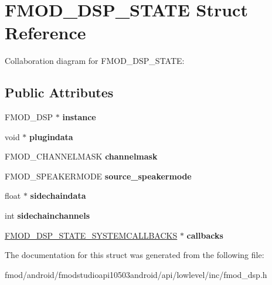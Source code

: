 \hypertarget{struct_f_m_o_d___d_s_p___s_t_a_t_e}{\section{F\+M\+O\+D\+\_\+\+D\+S\+P\+\_\+\+S\+T\+A\+T\+E Struct Reference}
\label{struct_f_m_o_d___d_s_p___s_t_a_t_e}
}


Collaboration diagram for F\+M\+O\+D\+\_\+\+D\+S\+P\+\_\+\+S\+T\+A\+T\+E\+:
\subsection*{Public Attributes}
\begin{DoxyCompactItemize}
\item 
\hypertarget{struct_f_m_o_d___d_s_p___s_t_a_t_e_a237b17d52742d83ced1b38f0c9d487cc}{F\+M\+O\+D\+\_\+\+D\+S\+P $\ast$ {\bfseries instance}}\label{struct_f_m_o_d___d_s_p___s_t_a_t_e_a237b17d52742d83ced1b38f0c9d487cc}

\item 
\hypertarget{struct_f_m_o_d___d_s_p___s_t_a_t_e_a343133eb99b15317082d94436196dbb4}{void $\ast$ {\bfseries plugindata}}\label{struct_f_m_o_d___d_s_p___s_t_a_t_e_a343133eb99b15317082d94436196dbb4}

\item 
\hypertarget{struct_f_m_o_d___d_s_p___s_t_a_t_e_a19d66dedcbccec2671ad65b6e546aa93}{F\+M\+O\+D\+\_\+\+C\+H\+A\+N\+N\+E\+L\+M\+A\+S\+K {\bfseries channelmask}}\label{struct_f_m_o_d___d_s_p___s_t_a_t_e_a19d66dedcbccec2671ad65b6e546aa93}

\item 
\hypertarget{struct_f_m_o_d___d_s_p___s_t_a_t_e_ad37c35be3104130b30239a5770ae7785}{F\+M\+O\+D\+\_\+\+S\+P\+E\+A\+K\+E\+R\+M\+O\+D\+E {\bfseries source\+\_\+speakermode}}\label{struct_f_m_o_d___d_s_p___s_t_a_t_e_ad37c35be3104130b30239a5770ae7785}

\item 
\hypertarget{struct_f_m_o_d___d_s_p___s_t_a_t_e_aeb85891138109aedceed04c92a3493e9}{float $\ast$ {\bfseries sidechaindata}}\label{struct_f_m_o_d___d_s_p___s_t_a_t_e_aeb85891138109aedceed04c92a3493e9}

\item 
\hypertarget{struct_f_m_o_d___d_s_p___s_t_a_t_e_a8380e0c924580c3879efaaf9dc7bac20}{int {\bfseries sidechainchannels}}\label{struct_f_m_o_d___d_s_p___s_t_a_t_e_a8380e0c924580c3879efaaf9dc7bac20}

\item 
\hypertarget{struct_f_m_o_d___d_s_p___s_t_a_t_e_a7ba9196b7c74f327463742e88b690502}{\hyperlink{struct_f_m_o_d___d_s_p___s_t_a_t_e___s_y_s_t_e_m_c_a_l_l_b_a_c_k_s}{F\+M\+O\+D\+\_\+\+D\+S\+P\+\_\+\+S\+T\+A\+T\+E\+\_\+\+S\+Y\+S\+T\+E\+M\+C\+A\+L\+L\+B\+A\+C\+K\+S} $\ast$ {\bfseries callbacks}}\label{struct_f_m_o_d___d_s_p___s_t_a_t_e_a7ba9196b7c74f327463742e88b690502}

\end{DoxyCompactItemize}


The documentation for this struct was generated from the following file\+:\begin{DoxyCompactItemize}
\item 
fmod/android/fmodstudioapi10503android/api/lowlevel/inc/fmod\+\_\+dsp.\+h\end{DoxyCompactItemize}
